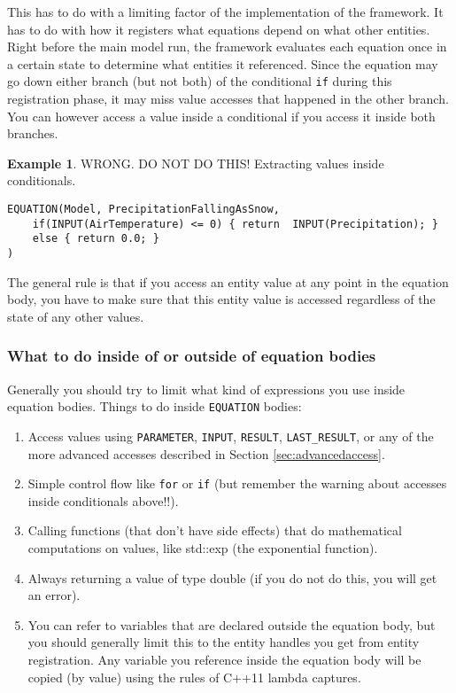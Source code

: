 \documentclass[11pt]{article}
\theoremstyle{definition}
\newtheorem{myexample}{Example}
\newenvironment{example}%
  {\begin{lrbox}{\examplebox}%
   \begin{minipage}{\dimexpr\linewidth-2\fboxsep}
   \begin{myexample}}%
  {\end{myexample}%
   \end{minipage}%
   \end{lrbox}%
   \begin{trivlist}
     \item[]\colorbox{silver}{\usebox\examplebox}
   \end{trivlist}}
\begin{document}
This has to do with a limiting factor of the implementation of the framework. It has to do with how it registers what equations depend on what other entities. Right before the main model run, the framework evaluates each equation once in a certain state to determine what entities it referenced. Since the equation may go down either branch (but not both) of the conditional {\tt if} during this registration phase, it may miss value accesses that happened in the other branch. You can however access a value inside a conditional if you access it inside both branches.

\begin{example}\label{ex:simplypequations}
WRONG. DO NOT DO THIS! Extracting values inside conditionals.
\begin{lstlisting}[style=mycpp]
EQUATION(Model, PrecipitationFallingAsSnow,
	if(INPUT(AirTemperature) <= 0) { return  INPUT(Precipitation); }
	else { return 0.0; }
)
\end{lstlisting}
\end{example}

The general rule is that if you access an entity value at any point in the equation body, you have to make sure that this entity value is accessed regardless of the state of any other values.

\subsubsection{What to do inside of or outside of equation bodies}

Generally you should try to limit what kind of expressions you use inside equation bodies. Things to do inside {\tt EQUATION} bodies:
\begin{enumerate}[i]
\item Access values using {\tt PARAMETER}, {\tt INPUT}, {\tt RESULT}, {\tt LAST\_RESULT}, or any of the more advanced accesses described in Section \ref{sec:advancedaccess}.
\item Simple control flow like {\tt for} or {\tt if} (but remember the warning about accesses inside conditionals above!!).
\item Calling functions (that don't have side effects) that do mathematical computations on values, like std::exp (the exponential function).
\item Always returning a value of type double (if you do not do this, you will get an error).
\item You can refer to variables that are declared outside the equation body, but you should generally limit this to the entity handles you get from entity registration. Any variable you reference inside the equation body will be copied (by value) using the rules of C++11 lambda captures.
\end{enumerate}
\end{document}
